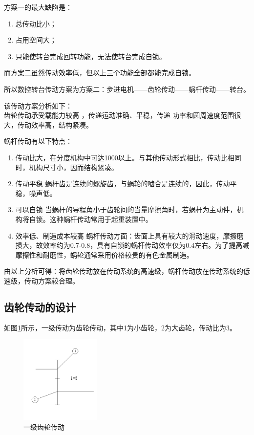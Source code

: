 \documentclass[a4paper,12pt]{article}
\begin{document}
方案一的最大缺陷是：
\begin{enumerate}
	\item 总传动比小；
\item 占用空间大；
\item 只能使转台完成回转功能，无法使转台完成自锁。

\end{enumerate}

而方案二虽然传动效率低，但以上三个功能全部都能完成自锁。

所以数控转台传动方案为方案二：步进电机——齿轮传动——蜗杆传动——转台。

该传动方案分析如下：
\\
齿轮传动承受载能力较高 ，传递运动准确、平稳，传递 功率和圆周速度范围很大，传动效率高，结构紧凑。

蜗杆传动有以下特点：
\begin{enumerate}
	\item 传动比大，在分度机构中可达1000以上。与其他传动形式相比，传动比相同时，机构尺寸小，因而结构紧凑。
\item 传动平稳 蜗杆齿是连续的螺旋齿，与蜗轮的啮合是连续的，因此，传动平稳，噪声低。
\item 可以自锁 当蜗杆的导程角小于齿轮间的当量摩擦角时，若蜗杆为主动件，机构将自锁。这种蜗杆传动常用于起重装置中。
\item 效率低、制造成本较高  蜗杆传动方面：齿面上具有较大的滑动速度，摩擦磨损大，故效率约为0.7-0.8，具有自锁的蜗杆传动效率仅为0.4左右。为了提高减摩擦性和耐磨性，蜗轮通常采用价格较贵的有色金属制造。

\end{enumerate}

由以上分析可得：将齿轮传动放在传动系统的高速级，蜗杆传动放在传动系统的低速级，传动方案较合理。


\subsection{齿轮传动的设计}
如图\ref{一级齿轮传动}所示，一级传动为齿轮传动，其中1为小齿轮，2为大齿轮，传动比为3。
	\begin{figure}[htb]
	\begin{center} 
		\includegraphics[width=4cm]{images/2}
		\caption{一级齿轮传动}  \label{一级齿轮传动}
	\end{center}
\end{figure}
\end{document}

